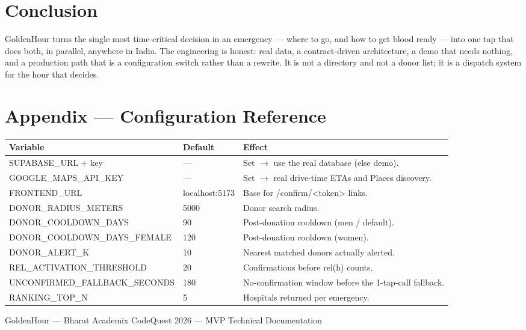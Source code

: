 \documentclass[11pt]{article}
\newcommand{\code}[1]{\colorbox{ghCodeBg}{\ttfamily\small #1}}
\begin{document}
\section{Conclusion}

GoldenHour turns the single most time-critical decision in an emergency --- where to
go, and how to get blood ready --- into one tap that does both, in parallel, anywhere
in India. The engineering is honest: real data, a contract-driven architecture, a
demo that needs nothing, and a production path that is a configuration switch rather
than a rewrite. It is not a directory and not a donor list; it is a dispatch system
for the hour that decides.

\appendix
\section{Appendix --- Configuration Reference}

\begin{center}
\begin{tabularx}{\textwidth}{@{}p{5.8cm} p{2.2cm} L@{}}
\toprule
\textbf{Variable} & \textbf{Default} & \textbf{Effect} \\
\midrule
\code{SUPABASE\_URL} + key & --- & Set $\rightarrow$ use the real database (else demo). \\
\code{GOOGLE\_MAPS\_API\_KEY} & --- & Set $\rightarrow$ real drive-time ETAs and Places discovery. \\
\code{FRONTEND\_URL} & localhost:5173 & Base for \code{/confirm/<token>} links. \\
\code{DONOR\_RADIUS\_METERS} & 5000 & Donor search radius. \\
\code{DONOR\_COOLDOWN\_DAYS} & 90 & Post-donation cooldown (men / default). \\
\code{DONOR\_COOLDOWN\_DAYS\_FEMALE} & 120 & Post-donation cooldown (women). \\
\code{DONOR\_ALERT\_K} & 10 & Nearest matched donors actually alerted. \\
\code{REL\_ACTIVATION\_THRESHOLD} & 20 & Confirmations before \code{rel(h)} counts. \\
\code{UNCONFIRMED\_FALLBACK\_SECONDS} & 180 & No-confirmation window before the 1-tap-call fallback. \\
\code{RANKING\_TOP\_N} & 5 & Hospitals returned per emergency. \\
\bottomrule
\end{tabularx}
\end{center}

\vfill
\begin{center}
{\sffamily\color{ghSlate}\small GoldenHour --- Bharat Academix CodeQuest 2026 --- MVP Technical Documentation}
\end{center}
\end{document}
